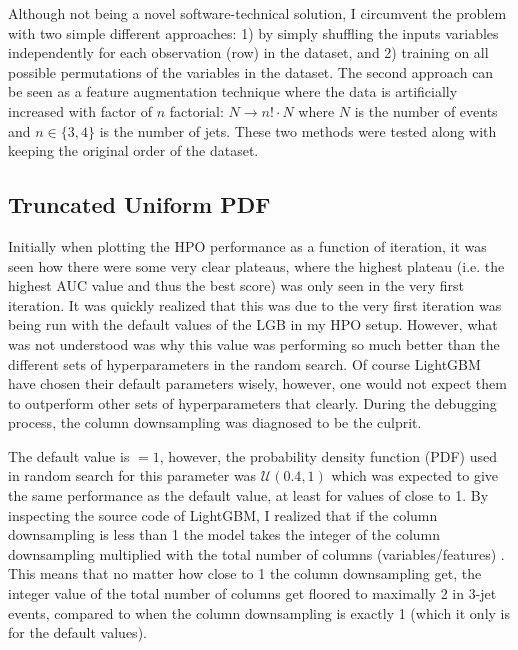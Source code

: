 Although not being a novel software-technical solution, I circumvent the problem with two simple different approaches: 1) by simply shuffling the inputs variables independently for each observation (row) in the dataset, and 2) training on all possible permutations of the variables in the dataset. The second approach can be seen as a feature augmentation technique where the data is artificially increased with factor of $n$ factorial: $N \rightarrow n!\cdot N$ where $N$ is the number of events and $n\in \{3, 4\}$ is the number of jets. These two methods were tested along with keeping the original order of the dataset. 


\subsection{Truncated Uniform PDF}
\label{subsec:q:trunc_uniform}

Initially when plotting the HPO performance as a function of iteration, it was seen how there were some very clear plateaus, where the highest plateau (i.e. the highest AUC value and thus the best score) was only seen in the very first iteration. It was quickly realized that this was due to the very first iteration was being run with the default values of the LGB in my HPO setup. However, what was not understood was why this value was performing so much better than the different sets of hyperparameters in the random search. Of course LightGBM have chosen their default parameters wisely, however, one would not expect them to outperform other sets of hyperparameters that clearly. During the debugging process, the column downsampling  was diagnosed to be the culprit. 

The default value is $=1$, however, the probability density function (PDF) used in random search for this parameter was $\mathcal{U}(0.4, 1)$ which was expected to give the same performance as the default value, at least for values of  close to \num{1}. By inspecting the source code of LightGBM, I realized that if the column downsampling is less than \num{1} the model takes the integer of the column downsampling multiplied with the total number of columns (variables/features) \autocite{MicrosoftLightGBM}. This means that no matter how close to \num{1} the column downsampling get, the integer value of the total number of columns get floored to {maximally} \num{2} in 3-jet events, compared to when the column downsampling is exactly \num{1} (which it only is for the default values).

